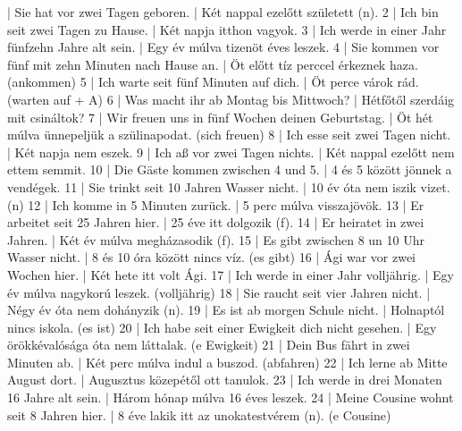 \documentclass{article}
\newenvironment{exmp}{\verbatim}{\endverbatim}
\begin{document}
\begin{exmp}
1 | Sie hat vor zwei Tagen geboren. | Két nappal ezelőtt született (n).
2 | Ich bin seit zwei Tagen zu Hause. | Két napja itthon vagyok.
3 | Ich werde in einer Jahr fünfzehn Jahre alt sein. | Egy év múlva tizenöt éves leszek.
4 | Sie kommen vor fünf mit zehn Minuten nach Hause an. | Öt előtt tíz perccel érkeznek haza. (ankommen)
5 | Ich warte seit fünf Minuten auf dich. | Öt perce várok rád. (warten auf + A)
6 | Was macht ihr ab Montag bis Mittwoch? | Hétfőtől szerdáig mit csináltok?
7 | Wir freuen uns in fünf Wochen deinen Geburtstag. | Öt hét múlva ünnepeljük a szülinapodat. (sich freuen)
8 | Ich esse seit zwei Tagen nicht. | Két napja nem eszek.
9 | Ich aß vor zwei Tagen nichts. | Két nappal ezelőtt nem ettem semmit.
10 | Die Gäste kommen zwischen 4 und 5. | 4 és 5 között jönnek a vendégek.
11 | Sie trinkt seit 10 Jahren Wasser nicht. | 10 év óta nem iszik vizet. (n)
12 | Ich komme in 5 Minuten zurück. | 5 perc múlva visszajövök.
13 | Er arbeitet seit 25 Jahren hier. | 25 éve itt dolgozik (f).
14 | Er heiratet in zwei Jahren. | Két év múlva megházasodik (f).
15 | Es gibt zwischen 8 un 10 Uhr Wasser nicht. | 8 és 10 óra között nincs víz. (es gibt)
16 | Ági war vor zwei Wochen hier. | Két hete itt volt Ági.
17 | Ich werde in einer Jahr volljährig. | Egy év múlva nagykorú leszek. (volljährig)
18 | Sie raucht seit vier Jahren nicht. | Négy év óta nem dohányzik (n).
19 | Es ist ab morgen Schule nicht. | Holnaptól nincs iskola. (es ist)
20 | Ich habe seit einer Ewigkeit dich nicht gesehen. | Egy örökkévalósága óta nem láttalak. (e Ewigkeit)
21 | Dein Bus fährt in zwei Minuten ab. | Két perc múlva indul a buszod. (abfahren)
22 | Ich lerne ab Mitte August dort. | Augusztus közepétől ott tanulok.
23 | Ich werde in drei Monaten 16 Jahre alt sein. | Három hónap múlva 16 éves leszek.
24 | Meine Cousine wohnt seit 8 Jahren hier. | 8 éve lakik itt az unokatestvérem (n). (e Cousine)
\end{exmp}
\end{document}
